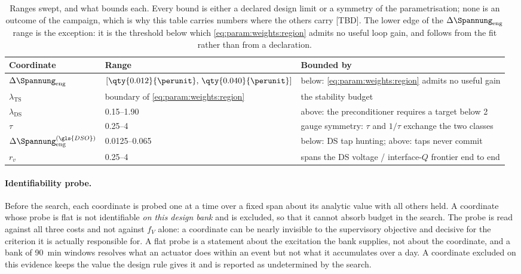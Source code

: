 \begin{table}[htbp]
	\centering
	\caption[Ranges swept, and what bounds each.]%
	{Ranges swept, and what bounds each.
		Every bound is either a declared design limit or a symmetry of the parametrisation; none is an outcome of the campaign, which is why this table carries numbers where the others carry [TBD].
		The lower edge of the $\Delta\Spannung_{\mathrm{eng}}$ range is the exception: it is the threshold below which \cref{eq:param:weights:region} admits no useful loop gain, and follows from the fit rather than from a declaration.}
	\label{tab:app_wsel:ranges}
	\small
	\begin{tabular}{l l l}
		\toprule
		Coordinate & Range & Bounded by \\
		\midrule
		$\Delta\Spannung_{\mathrm{eng}}$                 & $[\qty{0.012}{\perunit},\, \qty{0.040}{\perunit}]$ & below: \cref{eq:param:weights:region} admits no useful gain \\
		$\lambda_{\mathrm{TS}}$ & boundary of \cref{eq:param:weights:region} & the stability budget \\
		$\lambda_{\mathrm{DS}}$ & \numrange{0.15}{1.90}                    & above: the preconditioner requires a target below \num{2} \\
		$\tau$                  & \numrange{0.25}{4}                       & gauge symmetry: $\tau$ and $1/\tau$ exchange the two classes \\
		$\Delta\Spannung_{\mathrm{eng}}^{(\gls{DSO})}$   & \qtyrange{0.0125}{0.065}{\perunit}       & below: \gls{DS} tap hunting; above: taps never commit \\
		$r_{v}$                 & \numrange{0.25}{4}                       & spans the \gls{DS} voltage / interface-$Q$ frontier end to end \\
		\bottomrule
	\end{tabular}
\end{table}

\paragraph{Identifiability probe.}
Before the search, each coordinate is probed one at a time over a fixed span about its analytic value with all others held.
A coordinate whose probe is flat is not identifiable \emph{on this design bank} and is excluded, so that it cannot absorb budget in the search.
The probe is read against all three costs and not against $f_{V}$ alone: a coordinate can be nearly invisible to the supervisory objective and decisive for the criterion it is actually responsible for.
A flat probe is a statement about the excitation the bank supplies, not about the coordinate, and a bank of \qty{90}{\minute} windows resolves what an actuator does within an event but not what it accumulates over a day.
A coordinate excluded on this evidence keeps the value the design rule gives it and is reported as undetermined by the search.

